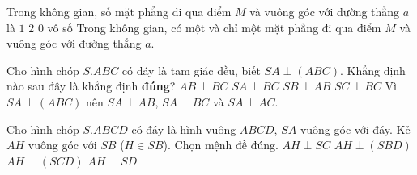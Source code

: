 \begin{ex}%
 Trong không gian, số mặt phẳng đi qua điểm $M$ và vuông góc với đường thẳng $a$ là
 \choice
  {\True $1$}
  {$2$}
  {$0$}
  {vô số}
 \loigiai
  {
  Trong không gian, có một và chỉ một mặt phẳng đi qua điểm $M$ và vuông góc với đường thẳng $a$.
  }
\end{ex}%
\begin{ex}%
	Cho hình chóp $S.ABC$ có đáy là tam giác đều, biết $SA\perp (ABC)$. Khẳng định nào sau đây là khẳng định \textbf{đúng}?
	\choice
	{$AB\perp BC$}
	{\True $SA\perp BC$}
	{$SB\perp AB$}
	{$SC\perp BC$}
	\loigiai
	{Vì $SA\perp (ABC)$ nên $SA\perp AB$, $SA\perp BC$ và $SA\perp AC$.}
\end{ex}%
\begin{ex}%
	Cho hình chóp $S.ABCD$ có đáy là hình vuông $ABCD$, $SA$ vuông góc với đáy. Kẻ $AH$ vuông góc với $SB$ ($H\in SB$). Chọn mệnh đề đúng.
	\choice
	{\True $AH\perp SC$}
	{$AH\perp (SBD)$}
	{$AH\perp (SCD)$}
	{$AH\perp SD$}
\end{ex}%
